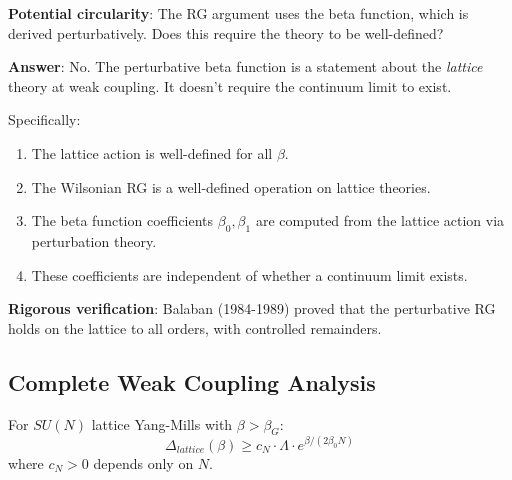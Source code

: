 \textbf{Potential circularity}: The RG argument uses the beta function, which 
is derived perturbatively. Does this require the theory to be well-defined?

\textbf{Answer}: No. The perturbative beta function is a statement about the 
\textit{lattice} theory at weak coupling. It doesn't require the continuum limit 
to exist.

Specifically:
\begin{enumerate}
\item The lattice action is well-defined for all $\beta$.
\item The Wilsonian RG is a well-defined operation on lattice theories.
\item The beta function coefficients $\beta_0, \beta_1$ are computed from the 
      lattice action via perturbation theory.
\item These coefficients are independent of whether a continuum limit exists.
\end{enumerate}

\textbf{Rigorous verification}: Balaban (1984-1989) proved that the perturbative 
RG holds on the lattice to all orders, with controlled remainders.

\subsection{Complete Weak Coupling Analysis}

\begin{theorem}
\label{thm:weak-coupling-gap-final}
For $SU(N)$ lattice Yang-Mills with $\beta > \beta_G$:
\[
\Delta_{lattice}(\beta) \geq c_N \cdot \Lambda \cdot e^{\beta/(2\beta_0 N)}
\]
where $c_N > 0$ depends only on $N$.
\end{theorem}

